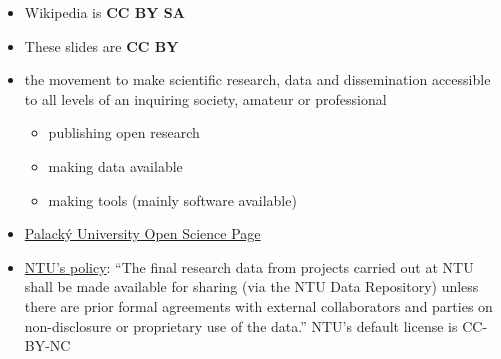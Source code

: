 \documentclass[a4paper,landscape,headrule,footrule,xetex]{foils}
\begin{document}
\begin{itemize}
\item Wikipedia is \textbf{CC BY SA}
\item These slides are \textbf{CC BY}
\end{itemize}



\begin{itemize}
\item the movement to make scientific research, data and dissemination accessible to all levels of an inquiring society, amateur or professional
  \begin{itemize}
  \item publishing open research
  \item making data available
  \item making tools (mainly software available)
  \end{itemize}
\item \href{https://openscience.upol.cz/en/}{Palacký University Open Science Page}
\item \href{http://research.ntu.edu.sg/rieo/RI/Pages/Research-Data-Policies.aspx}{NTU's policy}: ``The final research data from projects carried out
  at NTU shall be made available for sharing (via the NTU Data
  Repository) unless there are prior formal agreements with external
  collaborators and parties on non-disclosure or proprietary use of
  the data.''  NTU's default license is CC-BY-NC 
\end{itemize}
\end{document}
